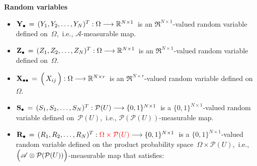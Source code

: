 \vskip 0.2cm
\noindent
\textbf{Random variables}
\begin{itemize}
\item
    $\mathbf{Y}_{\bullet} \,=\, (Y_{1},Y_{2},\ldots,Y_{N})^{T} : \Omega \longrightarrow \mathbb{R}^{N \times 1}$\,
    is an $\Re^{N \times 1}$-valued random variable defined on \,$\Omega$,\,
    i.e., $\mathscr{A}$-measurable map.
\item
    $\mathbf{Z}_{\bullet} \,=\, (Z_{1},Z_{2},\ldots,Z_{N})^{T} : \Omega \longrightarrow \mathbb{R}^{N \times 1}$\,
    is an $\Re^{N \times 1}$-valued random variable defined on \,$\Omega$.\,
\item
    $\Xdotdot\,=\,\left(\,\overset{{\color{white}.}}{X_{ij}}\,\right) : \Omega \longrightarrow \Re^{N \times r}$\,
    is an $\Re^{N \times r}$-valued random variable defined on \,$\Omega$.
\item
    $\mathbf{S}_{\bullet} \,=\, (S_{1},S_{2},\ldots,S_{N})^{T} : \mathcal{P}(U) \longrightarrow \{0,1\}^{N \times 1}$\,
    is a $\{0,1\}^{N \times 1}$-valued random variable defined on \,$\mathcal{P}(U)$,\,
    i.e., $\mathcal{P}(\mathcal{P}(U))$-measurable map.
\item
    $\mathbf{R}_{\bullet} \,=\, (R_{1},R_{2},\ldots,R_{N})^{T} : {\color{red}\Omega \times \mathcal{P}(U)} \longrightarrow \{0,1\}^{N \times 1}$\,
    is a $\{0,1\}^{N \times 1}$-valued random variable defined on the product probability space
    \,$\Omega \times \mathcal{P}(U)$,\,
    i.e.,
    \,$\left(\mathscr{A} \overset{{\color{white}.}}{\otimes} \mathcal{P}(\mathcal{P}(U))\right)$-measurable map
    that satisfies:

\end{itemize}
